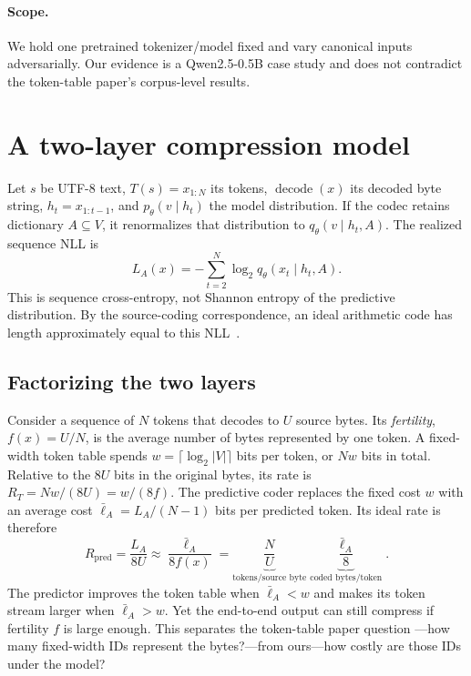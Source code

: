 \documentclass{article}
\begin{document}
\paragraph{Scope.}
We hold one pretrained tokenizer/model fixed and vary canonical inputs
adversarially. Our evidence is a Qwen2.5-0.5B case study and does not contradict
the token-table paper's corpus-level results.

\section{A two-layer compression model}
\label{sec:formulation}

Let $s$ be UTF-8 text, $T(s)=x_{1:N}$ its tokens,
$\operatorname{decode}(x)$ its decoded byte string,
$h_t=x_{1:t-1}$, and $p_\theta(v\mid h_t)$ the model distribution. If the
codec retains dictionary $A\subseteq V$, it renormalizes that distribution to
$q_\theta(v\mid h_t,A)$. The realized sequence NLL is
\begin{equation}
  L_A(x)=-\sum_{t=2}^{N}\log_2q_\theta(x_t\mid h_t,A).
\end{equation}
This is sequence cross-entropy, not Shannon entropy of the predictive
distribution. By the source-coding correspondence, an ideal arithmetic code has
length approximately equal to this NLL~\citep{shannon1948,witten1987,deletang2024language}.

\subsection{Factorizing the two layers}
Consider a sequence of $N$ tokens that decodes to $U$ source bytes. Its
\emph{fertility}, $f(x)=U/N$, is the average number of bytes represented by one
token. A fixed-width token table spends
$w=\lceil\log_2|V|\rceil$ bits per token, or $Nw$ bits in total. Relative to the
$8U$ bits in the original bytes, its rate is $R_T=Nw/(8U)=w/(8f)$. The
predictive coder replaces the fixed cost $w$ with an average cost
$\bar\ell_A=L_A/(N-1)$ bits per predicted token. Its ideal rate is therefore
\begin{equation}
R_{\mathrm{pred}}=\frac{L_A}{8U}
\approx \frac{\bar\ell_A}{8f(x)}
=\underbrace{\frac{N}{U}}_{\text{tokens/source byte}}
 \underbrace{\frac{\bar\ell_A}{8}}_{\text{coded bytes/token}}.
\label{eq:factorization}
\end{equation}
The predictor improves the token table when $\bar\ell_A<w$ and makes its token
stream larger when $\bar\ell_A>w$. Yet the end-to-end output can still compress
if fertility $f$ is large enough. This separates the token-table paper question
---how many fixed-width IDs represent the bytes?---from ours---how costly are
those IDs under the model?
\end{document}
